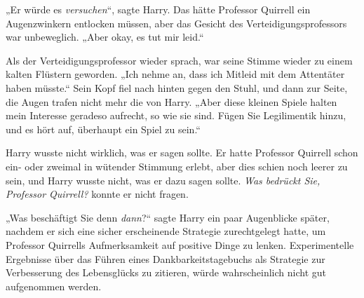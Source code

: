 „Er würde es \emph{versuchen}“, sagte Harry. Das hätte Professor Quirrell ein Augenzwinkern entlocken müssen, aber das Gesicht des Verteidigungsprofessors war unbeweglich.
„Aber okay, es tut mir leid.“

Als der Verteidigungsprofessor wieder sprach, war seine Stimme wieder zu einem kalten Flüstern geworden.
„Ich nehme an, dass ich Mitleid mit dem Attentäter haben müsste.“ Sein Kopf fiel nach hinten gegen den Stuhl, und dann zur Seite, die Augen trafen nicht mehr die von Harry.
„Aber diese kleinen Spiele halten mein Interesse geradeso aufrecht, so wie sie sind. Fügen Sie Legilimentik hinzu, und es hört auf, überhaupt ein Spiel zu sein.“

Harry wusste nicht wirklich, was er sagen sollte. Er hatte Professor Quirrell schon ein- oder zweimal in wütender Stimmung erlebt, aber dies schien noch leerer zu sein, und Harry wusste nicht, was er dazu sagen sollte. \emph{Was bedrückt Sie, Professor Quirrell?} konnte er nicht fragen.

„Was beschäftigt Sie denn \emph{dann}?“ sagte Harry ein paar Augenblicke später, nachdem er sich eine sicher erscheinende Strategie zurechtgelegt hatte, um Professor Quirrells Aufmerksamkeit auf positive Dinge zu lenken. Experimentelle Ergebnisse über das Führen eines Dankbarkeitstagebuchs als Strategie zur Verbesserung des Lebensglücks zu zitieren, würde wahrscheinlich nicht gut aufgenommen werden.

